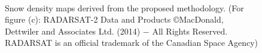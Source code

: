 \begin{figure}[!htbp]
	\centering
	 \\
	\caption [Snow density mps from Radarsat-2 data]{Snow density maps derived from the proposed methodology. (For figure (c): RADARSAT-2 Data and Products ©MacDonald, Dettwiler and Associates Ltd. (2014) $-$ All Rights Reserved. RADARSAT is an official trademark of the Canadian Space Agency)}
	\label{fig:proposed_results}
\end{figure}

